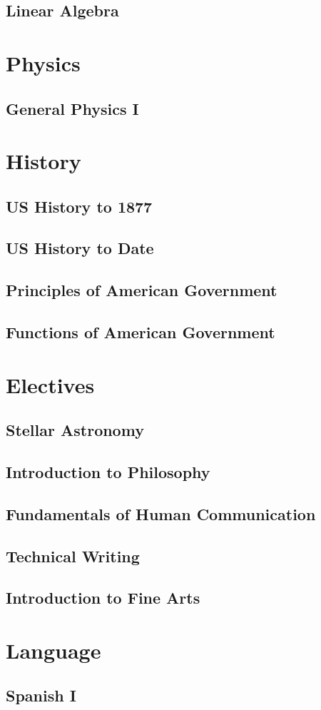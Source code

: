 \documentclass[11pt]{book}
\begin{document}
\chapter{Linear Algebra}

\part{Physics}
\chapter{General Physics I}


\part{History}
\chapter{US History to 1877}
\chapter{US History to Date}
\chapter{Principles of American Government}
\chapter{Functions of American Government}

\part{Electives}
\chapter{Stellar Astronomy}
\chapter{Introduction to Philosophy}
\chapter{Fundamentals of Human Communication}
\chapter{Technical Writing}
\chapter{Introduction to Fine Arts}



\part{Language}
\chapter{Spanish I}
\end{document}
